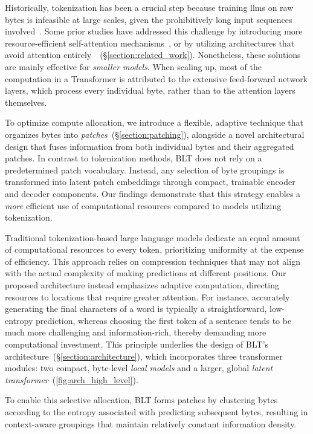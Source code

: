 Historically, tokenization has been a crucial step because training llms on raw bytes is infeasible at large scales, given the prohibitively long input sequences involved~\citep{xue2022byt5}. Some prior studies have addressed this challenge by introducing more resource-efficient self-attention mechanisms~\citep{el2020characterbert, clark2022canine}, or by utilizing architectures that avoid attention entirely~\citep{wang2024mambabyte}~(\S\ref{section:related_work}). Nonetheless, these solutions are mainly effective for \textit{smaller models}. When scaling up, most of the computation in a Transformer is attributed to the extensive feed-forward network layers, which process every individual byte, rather than to the attention layers themselves.

To optimize compute allocation, we introduce a flexible, adaptive technique that organizes bytes into \textit{patches}~(\S\ref{section:patching}), alongside a novel architectural design that fuses information from both individual bytes and their aggregated patches. In contrast to tokenization methods, {\textsc BLT} does not rely on a predetermined patch vocabulary. Instead, any selection of byte groupings is transformed into latent patch embeddings through compact, trainable encoder and decoder components. Our findings demonstrate that this strategy enables a \textit{more} efficient use of computational resources compared to models utilizing tokenization.

Traditional tokenization-based large language models dedicate an equal amount of computational resources to every token, prioritizing uniformity at the expense of efficiency. This approach relies on compression techniques that may not align with the actual complexity of making predictions at different positions. Our proposed architecture instead emphasizes adaptive computation, directing resources to locations that require greater attention. For instance, accurately generating the final characters of a word is typically a straightforward, low-entropy prediction, whereas choosing the first token of a sentence tends to be much more challenging and information-rich, thereby demanding more computational investment. This principle underlies the design of {\textsc BLT}'s architecture~(\S\ref{section:architecture}), which incorporates three transformer modules: two compact, byte-level \textit{local models} and a larger, global \textit{latent transformer}~(\autoref{fig:arch_high_level}). 

To enable this selective allocation, {\textsc BLT} forms patches by clustering bytes according to the entropy associated with predicting subsequent bytes, resulting in context-aware groupings that maintain relatively constant information density.

